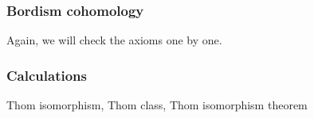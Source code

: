 \documentclass[a4paper,11pt]{article}
\begin{document}
\subsubsection{Bordism cohomology}
Again, we will check the axioms one by one.

\subsubsection{Calculations}

Thom isomorphism, Thom class, Thom isomorphism theorem


\newpage\printbibliography%
\end{document}
